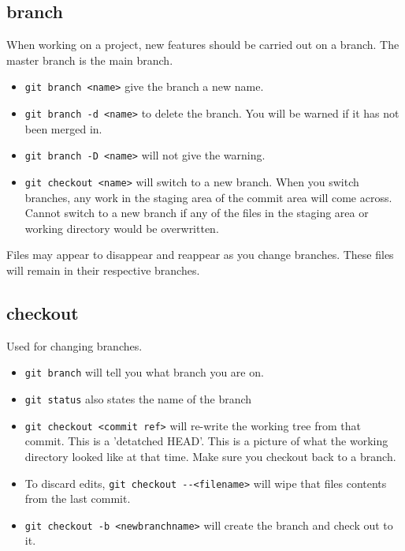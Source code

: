 \documentclass[11pt]{article} %
\begin{document}
\subsection*{branch}
When working on a project, new features should be carried out on a branch. The master branch is the main branch.  
\begin{itemize}
\item \lstinline{git branch <name>} give the branch a new name. 
\item \lstinline{git branch -d <name>} to delete the branch.  You will be warned if it has not been merged in. 
\item \lstinline{git branch -D <name>} will not give the warning. 
\item \lstinline{git checkout <name>} will switch to a new branch. When you switch branches, any work in the staging area of the commit area will come across. Cannot switch to a new branch if any of the files in the staging area or working directory would be overwritten.  
\end{itemize}
Files may appear to disappear and reappear as you change branches.  These files will remain in their respective branches. 

\subsection{checkout}
Used for changing branches. 
\begin{itemize}
\item \lstinline{git branch} will tell you what branch you are on.
\item \lstinline{git status} also states the name of the branch
\item \lstinline{git checkout <commit ref>} will re-write the working tree from that commit. This is a 'detatched HEAD'. This is a picture of what the working directory looked like at that time. Make sure you checkout back to a branch. 
\item To discard edits, \lstinline{git checkout --<filename>} will wipe that files contents from the last commit. 
\item \lstinline{git checkout -b <newbranchname>} will create the branch and check out to it.
\end{itemize}
\end{document}
